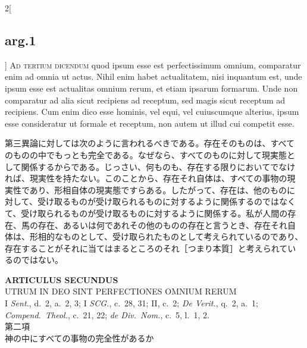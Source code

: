 \documentclass[paper=a4paper,fontsize=10pt,jafontsize=9pt,titlepage]{jlreq}
\begin{document}
\begin{paracol}{2}[\subsection{arg.1}]
{\scshape Ad tertium dicendum} quod ipsum esse est perfectissimum
omnium, comparatur enim ad omnia ut actus. Nihil enim habet
actualitatem, nisi inquantum est, unde ipsum esse est actualitas
omnium rerum, et etiam ipsarum formarum. Unde non comparatur ad alia
sicut recipiens ad receptum, sed magis sicut receptum ad
recipiens. Cum enim dico esse hominis, vel equi, vel cuiuscumque
alterius, ipsum esse consideratur ut formale et receptum, non autem ut
illud cui competit esse.

\switchcolumn

第三異論に対しては次のように言われるべきである。存在そのものは、すべて
のものの中でもっとも完全である。なぜなら、すべてのものに対して現実態と
して関係するからである。じっさい、何ものも、存在する限りにおいてでなけ
れば、現実性を持たない。このことから、存在それ自体は、すべての事物の現
実性であり、形相自体の現実態ですらある。したがって、存在は、他のものに
対して、受け取るものが受け取られるものに対するように関係するのではなく
て、受け取られるものが受け取るものに対するように関係する。私が人間の存
在、馬の存在、あるいは何であれその他のものの存在と言うとき、存在それ自
体は、形相的なものとして、受け取られたものとして考えられているのであり、
存在することがそれに当てはまるところのそれ［つまり本質］と考えられてい
るのではない。

\end{paracol}


\newpage
{}
{}
\setcounter{section}{2}
\setcounter{subsection}{0}

\begin{center}
 {\Large {\bfseries ARTICULUS SECUNDUS}}\\
 {\large UTRUM IN DEO SINT PERFECTIONES OMNIUM RERUM}\\
 {\footnotesize I {\itshape Sent.}, d.~2, a.~2, 3; I {\itshape SCG.},
 c.~28, 31; II, c.~2; {\itshape De Verit.}, q.~2, a.~1; {\itshape
 Compend.~Theol.}, c.~21, 22; {\itshape de Div.~Nom.}, c.~5, l.~1, 2.}\\
 {\Large 第二項\\神の中にすべての事物の完全性があるか }
\end{center}
\end{document}
